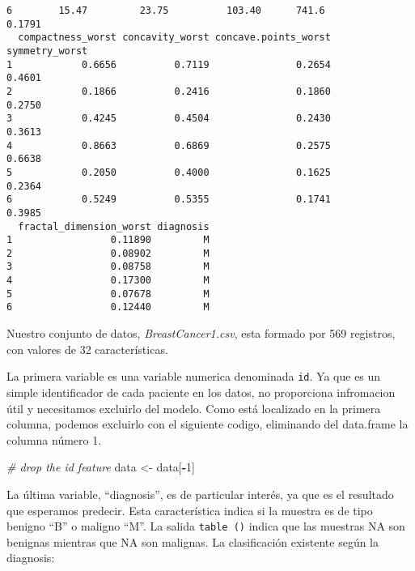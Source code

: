 \documentclass[
]{article}
\newenvironment{Shaded}{\begin{snugshade}}{\end{snugshade}}
\newcommand{\CommentTok}[1]{\textcolor[rgb]{0.56,0.35,0.01}{\textit{#1}}}
\newcommand{\DecValTok}[1]{\textcolor[rgb]{0.00,0.00,0.81}{#1}}
\newcommand{\KeywordTok}[1]{\textcolor[rgb]{0.13,0.29,0.53}{\textbf{#1}}}
\newcommand{\NormalTok}[1]{#1}
\newcommand{\OperatorTok}[1]{\textcolor[rgb]{0.81,0.36,0.00}{\textbf{#1}}}
\newcommand{\StringTok}[1]{\textcolor[rgb]{0.31,0.60,0.02}{#1}}
\begin{document}
\begin{verbatim}
6        15.47         23.75          103.40      741.6           0.1791
  compactness_worst concavity_worst concave.points_worst symmetry_worst
1            0.6656          0.7119               0.2654         0.4601
2            0.1866          0.2416               0.1860         0.2750
3            0.4245          0.4504               0.2430         0.3613
4            0.8663          0.6869               0.2575         0.6638
5            0.2050          0.4000               0.1625         0.2364
6            0.5249          0.5355               0.1741         0.3985
  fractal_dimension_worst diagnosis
1                 0.11890         M
2                 0.08902         M
3                 0.08758         M
4                 0.17300         M
5                 0.07678         M
6                 0.12440         M
\end{verbatim}

Nuestro conjunto de datos, \emph{BreastCancer1.csv}, esta formado por
569 registros, con valores de 32 características.

La primera variable es una variable numerica denominada \texttt{id}. Ya
que es un simple identificador de cada paciente en los datos, no
proporciona infromacion útil y necesitamos excluirlo del modelo. Como
está localizado en la primera columna, podemos excluirlo con el
siguiente codigo, eliminando del data.frame la columna número 1.

\begin{Shaded}
\begin{Highlighting}[]
\CommentTok{# drop the id feature}
\NormalTok{data <-}\StringTok{ }\NormalTok{data[}\OperatorTok{-}\DecValTok{1}\NormalTok{]}
\end{Highlighting}
\end{Shaded}

La última variable, ``diagnosis'', es de particular interés, ya que es
el resultado que esperamos predecir. Esta característica indica si la
muestra es de tipo benigno ``B'' o maligno ``M''. La salida
\texttt{table\ ()} indica que las muestras NA son benignas mientras que
NA son malignas. La clasificación existente según la diagnosis:

\begin{Shaded}
\end{Shaded}
\end{document}
